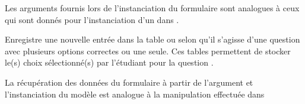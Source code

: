 \documentclass[a4paper,11pt,openany,oneside]{sphinxmanual}
\begin{document}
\begin{fulllineitems}
\begin{fulllineitems}
Les arguments fournis lors de l'instanciation du formulaire sont analogues
à ceux qui sont donnés pour l'instanciation d'un  dans .

\end{fulllineitems}


\begin{fulllineitems}
\label{database:quiz.models.Qcm.save_submit}
Enregistre une nouvelle entrée dans la table 
ou  selon qu'il s'agisse d'une question avec
plusieurs options correctes ou une seule. Ces tables permettent de stocker
le(s) choix sélectionné(s) par l'étudiant pour la question .

La récupération des données du formulaire à partir de l'argument 
et l'instanciation du modèle est analogue à la manipulation effectuée dans 

\end{fulllineitems}


\end{fulllineitems}

\end{document}
